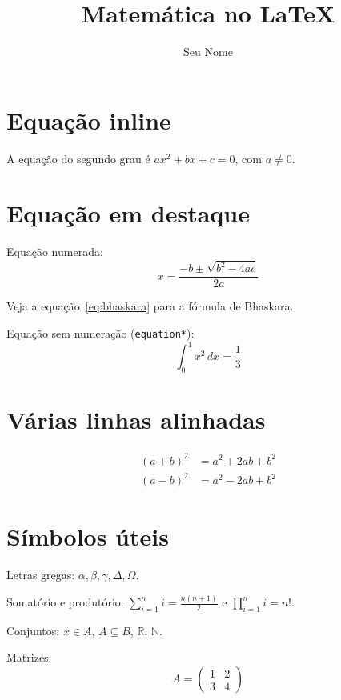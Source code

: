 \documentclass[12pt, a4paper]{article}
\title{Matemática no LaTeX}
\author{Seu Nome}
\date{}
\begin{document}
\maketitle

\section{Equação inline}
A equação do segundo grau é $ax^2 + bx + c = 0$, com $a \neq 0$.

\section{Equação em destaque}
Equação numerada:
\begin{equation}
    x = \frac{-b \pm \sqrt{b^2 - 4ac}}{2a}
    \label{eq:bhaskara}
\end{equation}

Veja a equação~\eqref{eq:bhaskara} para a fórmula de Bhaskara.

Equação sem numeração (\texttt{equation*}):
\[
    \int_0^1 x^2 \, dx = \frac{1}{3}
\]

\section{Várias linhas alinhadas}
\begin{align}
    (a + b)^2 &= a^2 + 2ab + b^2 \\
    (a - b)^2 &= a^2 - 2ab + b^2
\end{align}

\section{Símbolos úteis}
Letras gregas: $\alpha, \beta, \gamma, \Delta, \Omega$.

Somatório e produtório: $\sum_{i=1}^{n} i = \frac{n(n+1)}{2}$ e $\prod_{i=1}^{n} i = n!$.

Conjuntos: $x \in A$, $A \subseteq B$, $\mathbb{R}$, $\mathbb{N}$.

Matrizes:
\[
    A = \begin{pmatrix} 1 & 2 \\ 3 & 4 \end{pmatrix}
\]
\end{document}
